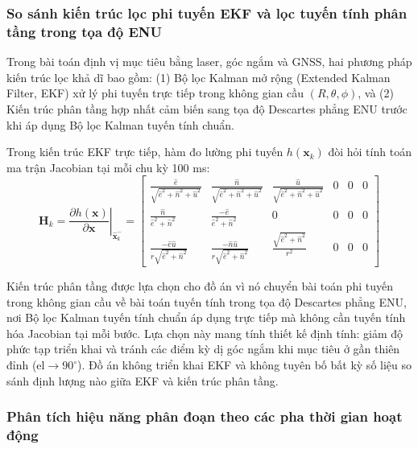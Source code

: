 \subsubsection{So sánh kiến trúc lọc phi tuyến EKF và lọc tuyến tính phân tầng trong tọa độ ENU}

\hspace{0.5cm} Trong bài toán định vị mục tiêu bằng laser, góc ngắm và GNSS, hai phương pháp kiến trúc lọc khả dĩ bao gồm: (1) Bộ lọc Kalman mở rộng (Extended Kalman Filter, EKF) xử lý phi tuyến trực tiếp trong không gian cầu $(R, \theta, \phi)$, và (2) Kiến trúc phân tầng hợp nhất cảm biến sang tọa độ Descartes phẳng ENU trước khi áp dụng Bộ lọc Kalman tuyến tính chuẩn.

Trong kiến trúc EKF trực tiếp, hàm đo lường phi tuyến $h(\mathbf{x}_k)$ đòi hỏi tính toán ma trận Jacobian tại mỗi chu kỳ 100 ms:
\begin{equation}
\mathbf{H}_k = \left. \frac{\partial h(\mathbf{x})}{\partial \mathbf{x}} \right|_{\hat{\mathbf{x}}_k^-} = \begin{bmatrix}
\frac{\hat{e}}{\sqrt{\hat{e}^2 + \hat{n}^2 + \hat{u}^2}} & \frac{\hat{n}}{\sqrt{\hat{e}^2 + \hat{n}^2 + \hat{u}^2}} & \frac{\hat{u}}{\sqrt{\hat{e}^2 + \hat{n}^2 + \hat{u}^2}} & 0 & 0 & 0 \\
\frac{\hat{n}}{\hat{e}^2 + \hat{n}^2} & \frac{-\hat{e}}{\hat{e}^2 + \hat{n}^2} & 0 & 0 & 0 & 0 \\
\frac{-\hat{e}\hat{u}}{r \sqrt{\hat{e}^2 + \hat{n}^2}} & \frac{-\hat{n}\hat{u}}{r \sqrt{\hat{e}^2 + \hat{n}^2}} & \frac{\sqrt{\hat{e}^2 + \hat{n}^2}}{r^2} & 0 & 0 & 0
\end{bmatrix}
\label{eq:ekf-jacobian}
\end{equation}

Kiến trúc phân tầng được lựa chọn cho đồ án vì nó chuyển bài toán phi tuyến trong không gian cầu về bài toán tuyến tính trong tọa độ Descartes phẳng ENU, nơi Bộ lọc Kalman tuyến tính chuẩn áp dụng trực tiếp mà không cần tuyến tính hóa Jacobian tại mỗi bước. Lựa chọn này mang tính thiết kế định tính: giảm độ phức tạp triển khai và tránh các điểm kỳ dị góc ngắm khi mục tiêu ở gần thiên đỉnh ($\text{el} \to 90^\circ$). Đồ án không triển khai EKF và không tuyên bố bất kỳ số liệu so sánh định lượng nào giữa EKF và kiến trúc phân tầng.



\subsubsection{Phân tích hiệu năng phân đoạn theo các pha thời gian hoạt động}


